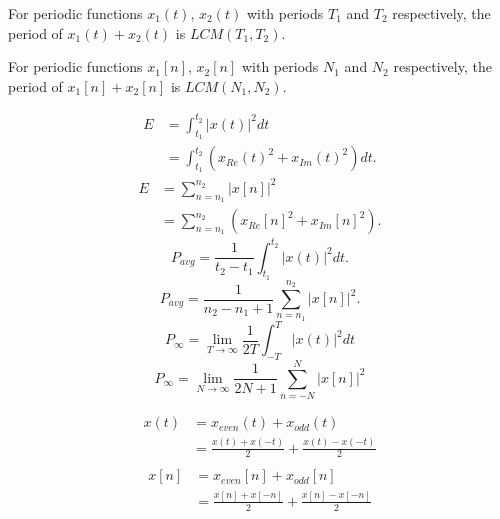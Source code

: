 \documentclass[8pt]{article}
\begin{document}


For periodic functions \(x_1(t)\), \(x_2(t)\) with periods \(T_1\) and
\(T_2\) respectively, the period of \(x_1(t) + x_2(t)\) is \(LCM(T_1, T_2)\).

For periodic functions \(x_1[n]\), \(x_2[n]\) with periods \(N_1\) and
\(N_2\) respectively, the period of \(x_1[n] + x_2[n]\) is \(LCM(N_1, N_2)\).

\begin{align*}
    E & = \int_{t_1}^{t_2} |x(t)|^2 dt                     \\
      & = \int_{t_1}^{t_2} (x_{Re}(t)^2 + x_{Im}(t)^2) dt.
\end{align*}
\begin{align*}
    E & = \sum_{n=n_1}^{n_2} |x[n]|^2                     \\
      & = \sum_{n=n_1}^{n_2} (x_{Re}[n]^2 + x_{Im}[n]^2).
\end{align*}
\begin{equation*}
    P_{avg} = \frac{1}{t_2 - t_1} \int_{t_1}^{t_2} |x(t)|^2 dt.
\end{equation*}
\begin{equation*}
    P_{avg} = \frac{1}{n_2 - n_1 + 1} \sum_{n=n_1}^{n_2} |x[n]|^2.
\end{equation*}
\begin{equation*}
    P_{\infty} = \lim_{T \rightarrow \infty} \frac{1}{2T} \int_{-T}^{T} |x(t)|^2 dt
\end{equation*}
\begin{equation*}
    P_{\infty} = \lim_{N \rightarrow \infty} \frac{1}{2N + 1} \sum_{n=-N}^{N} |x[n]|^2
\end{equation*}

\begin{align*}
    x(t) & = x_{even}(t) + x_{odd}(t)                        \\
         & = \frac{x(t) + x(-t)}{2} + \frac{x(t) - x(-t)}{2} \\
\end{align*}
\begin{align*}
    x[n] & = x_{even}[n] + x_{odd}[n]                        \\
         & = \frac{x[n] + x[-n]}{2} + \frac{x[n] - x[-n]}{2} \\
\end{align*}
\end{document}
